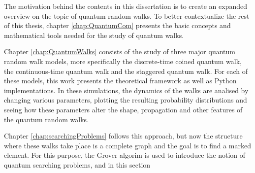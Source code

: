 \documentclass[../../dissertation.tex]{subfiles}
\begin{document}
The motivation behind the contents in this dissertation is to create an
expanded overview on  the topic of quantum random walks. To better
contextualize the rest of this thesis, chapter \ref{chap:QuantumCom} presents
the basic concepts and mathematical tools needed for the study of quantum
walks. \par

Chapter \ref{chap:QuantumWalks} consists of the study of three major quantum
random walk models, more specifically the discrete-time coined quantum walk,
the continuous-time quantum walk and the staggered quantum walk. For each of
these models, this work presents the theoretical framework as well as Python
implementations. In these simulations, the dynamics of the walks are analised
by changing various parameters, plotting the resulting probability
distributions and seeing how these parameters alter the shape, propagation and
other features of the quantum random walks.\par

Chapter \ref{chap:searchingProblems} follows this approach, but now the
structure where these walks take place is a complete graph and the goal is to
find a marked element. For this purpose, the Grover algorim is used to
introduce the notion of quantum searching problems, and in this section  
\end{document}
